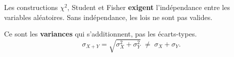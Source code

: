 \documentclass[11pt,a4paper]{article}
\begin{document}
\begin{alertbox}
Les constructions $\chi^2$, Student et Fisher \textbf{exigent} l'ind\'ependance entre les variables al\'eatoires. Sans ind\'ependance, les lois ne sont pas valides.
\end{alertbox}

\begin{alertbox}
Ce sont les \textbf{variances} qui s'additionnent, pas les \'ecarts-types.
$$\sigma_{X+Y} = \sqrt{\sigma_X^2 + \sigma_Y^2} \;\neq\; \sigma_X + \sigma_Y.$$
\end{alertbox}
\end{document}

